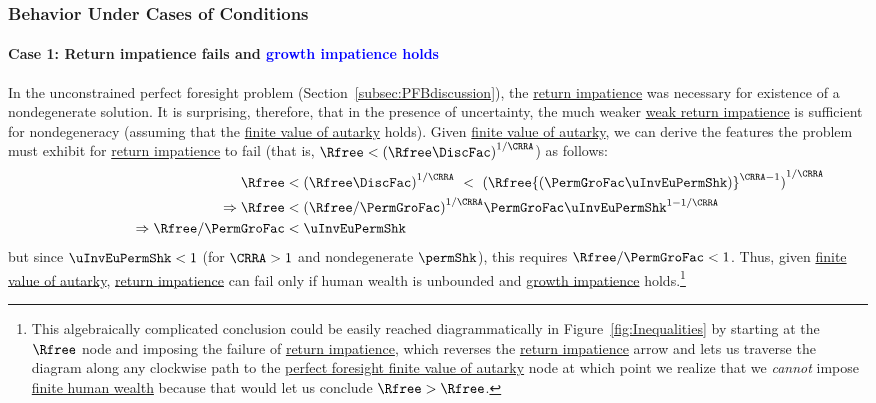 \documentclass[BufferStockTheory]{subfiles}
\begin{document}
\subsubsection{Behavior Under Cases of Conditions}\label{subsubsec:casesUC}

\hypertarget{IntuitionRIC}{}
\paragraph{Case 1: Return impatience fails and \textcolor{blue}{growth impatience holds}} 

In the unconstrained perfect foresight problem (Section~\ref{subsec:PFBdiscussion}), the \hyperlink{RIC}{return impatience} was necessary for existence of a nondegenerate solution.  It is surprising, therefore, that in the presence of uncertainty, the much weaker \hyperlink{WRIC}{weak return impatience} is sufficient for nondegeneracy (assuming that the \hyperlink{FVAC}{finite value of autarky}  holds). Given \hyperlink{FVAC}{finite value of autarky}, we can derive the features the problem must exhibit for \hyperlink{RIC}{return impatience} to fail (that is, $\Rfree < {(\Rfree \DiscFac)}^{1/\CRRA}$) as follows:
%
\begin{equation}\label{eq:RICimplies}
  \begin{split}
    \Rfree   & < {(\Rfree \DiscFac)}^{1/\CRRA} ~ < ~ {(\Rfree {(\PermGroFac \uInvEuPermShk)}^{\CRRA-1})}^{1/\CRRA}
    \\ \Rightarrow \Rfree   & < {(\Rfree/\PermGroFac)}^{1/\CRRA}\PermGroFac \uInvEuPermShk^{1-1/\CRRA}
    \\  \qquad\qquad\qquad \Rightarrow  \Rfree/\PermGroFac  & < \uInvEuPermShk
  \end{split}
\end{equation}
%
but since $\uInvEuPermShk < 1$ (for $\CRRA>1$ and nondegenerate $\permShk$), this requires $\Rfree/\PermGroFac < 1$. Thus, given \hyperlink{FVAC}{finite value of autarky}, \hyperlink{RIC}{return impatience} can fail only if human wealth is unbounded and \hyperlink{GIC-Raw}{growth impatience} holds.\footnote{This algebraically complicated conclusion could be easily reached diagrammatically in Figure~\ref{fig:Inequalities} by starting at the $\Rfree$ node and imposing the failure of \hyperlink{RIC}{return impatience}, which reverses the \hyperlink{RIC}{return impatience} arrow and lets us traverse the diagram along any clockwise path to the \hyperlink{FVAC}{perfect foresight finite value of autarky} node at which point we realize that we \textit{cannot} impose \hyperlink{FHWC}{finite human wealth} because that would let us conclude $\Rfree > \Rfree$.}
\end{document}
